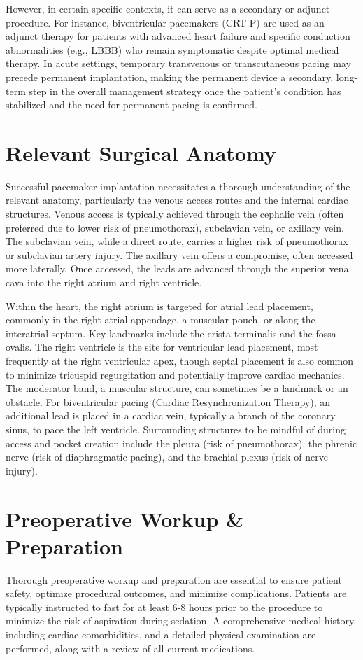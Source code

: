 However, in certain specific contexts, it can serve as a secondary or adjunct procedure. For instance, biventricular pacemakers (CRT-P) are used as an adjunct therapy for patients with advanced heart failure and specific conduction abnormalities (e.g., LBBB) who remain symptomatic despite optimal medical therapy. In acute settings, temporary transvenous or transcutaneous pacing may precede permanent implantation, making the permanent device a secondary, long-term step in the overall management strategy once the patient's condition has stabilized and the need for permanent pacing is confirmed.

\section*{Relevant Surgical Anatomy}
Successful pacemaker implantation necessitates a thorough understanding of the relevant anatomy, particularly the venous access routes and the internal cardiac structures. Venous access is typically achieved through the cephalic vein (often preferred due to lower risk of pneumothorax), subclavian vein, or axillary vein. The subclavian vein, while a direct route, carries a higher risk of pneumothorax or subclavian artery injury. The axillary vein offers a compromise, often accessed more laterally. Once accessed, the leads are advanced through the superior vena cava into the right atrium and right ventricle.

Within the heart, the right atrium is targeted for atrial lead placement, commonly in the right atrial appendage, a muscular pouch, or along the interatrial septum. Key landmarks include the crista terminalis and the fossa ovalis. The right ventricle is the site for ventricular lead placement, most frequently at the right ventricular apex, though septal placement is also common to minimize tricuspid regurgitation and potentially improve cardiac mechanics. The moderator band, a muscular structure, can sometimes be a landmark or an obstacle. For biventricular pacing (Cardiac Resynchronization Therapy), an additional lead is placed in a cardiac vein, typically a branch of the coronary sinus, to pace the left ventricle. Surrounding structures to be mindful of during access and pocket creation include the pleura (risk of pneumothorax), the phrenic nerve (risk of diaphragmatic pacing), and the brachial plexus (risk of nerve injury).

\section*{Preoperative Workup \& Preparation}
Thorough preoperative workup and preparation are essential to ensure patient safety, optimize procedural outcomes, and minimize complications. Patients are typically instructed to fast for at least 6-8 hours prior to the procedure to minimize the risk of aspiration during sedation. A comprehensive medical history, including cardiac comorbidities, and a detailed physical examination are performed, along with a review of all current medications.

